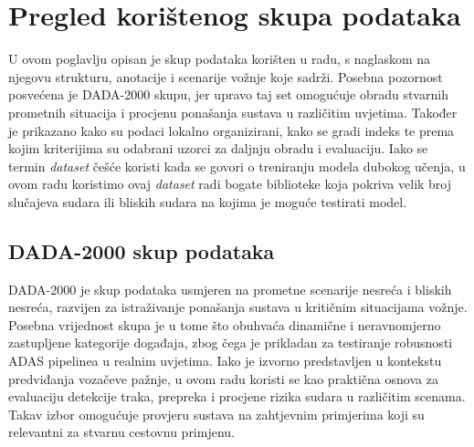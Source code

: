 \chapter{Pregled korištenog skupa podataka}
U ovom poglavlju opisan je skup podataka korišten u radu, s naglaskom na njegovu strukturu, anotacije i scenarije vožnje koje sadrži. Posebna pozornost posvećena je DADA-2000\supercite{dada2000github} skupu, jer upravo taj set omogućuje obradu stvarnih prometnih situacija i procjenu ponašanja sustava u različitim uvjetima. Također je prikazano kako su podaci lokalno organizirani, kako se gradi indeks te prema kojim kriterijima su odabrani uzorci za daljnju obradu i evaluaciju. Iako se termin \textit{dataset} češće koristi kada se govori o treniranju modela dubokog učenja, u ovom radu koristimo ovaj \textit{dataset} radi bogate biblioteke koja pokriva velik broj slučajeva sudara ili bliskih sudara na kojima je moguće testirati model.

\section{DADA-2000 skup podataka}
DADA-2000 je skup podataka usmjeren na prometne scenarije nesreća i bliskih nesreća, razvijen za istraživanje ponašanja sustava u kritičnim situacijama vožnje. Posebna vrijednost skupa je u tome što obuhvaća dinamične i neravnomjerno zastupljene kategorije događaja, zbog čega je prikladan za testiranje robusnosti ADAS pipelinea u realnim uvjetima. Iako je izvorno predstavljen u kontekstu predviđanja vozačeve pažnje, u ovom radu koristi se kao praktična osnova za evaluaciju detekcije traka, prepreka i procjene rizika sudara u različitim scenama. Takav izbor omogućuje provjeru sustava na zahtjevnim primjerima koji su relevantni za stvarnu cestovnu primjenu.

